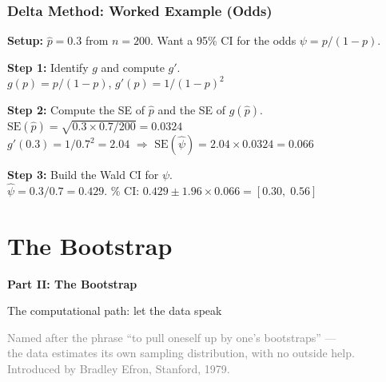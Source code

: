 \documentclass[aspectratio=169]{beamer}
\begin{document}
\begin{frame}
\frametitle{Delta Method: Worked Example (Odds)}

\small
\textbf{Setup:} $\hat{p} = 0.3$ from $n = 200$. Want a 95\% CI for the odds $\psi = p/(1-p)$.

\vspace{0.1cm}
\pause
\textbf{Step 1:} Identify $g$ and compute $g'$.\\[2pt]
$g(p) = p/(1-p)$, \quad $g'(p) = 1/(1-p)^2$

\pause
\vspace{0.1cm}
\textbf{Step 2:} Compute the SE of $\hat{p}$ and the SE of $g(\hat{p})$.\\[2pt]
$\text{SE}(\hat{p}) = \sqrt{0.3 \times 0.7 / 200} = 0.0324$\\[2pt]
$g'(0.3) = 1 / 0.7^2 = 2.04$ \qquad $\Rightarrow$ \qquad $\text{SE}(\hat\psi) = 2.04 \times 0.0324 = 0.066$

\pause
\vspace{0.1cm}
\textbf{Step 3:} Build the Wald CI for $\psi$.\\[2pt]
$\hat\psi = 0.3/0.7 = 0.429$. \% CI: $0.429 \pm 1.96 \times 0.066 = [0.30, \; 0.56]$

\vspace{0.15cm}
\begin{center}
\end{center}
\end{frame}

\section{The Bootstrap}

\begin{frame}
\begin{center}
  \vspace{1.5cm}
  {\Huge\bfseries\textcolor{popblue}{Part II: The Bootstrap}}

  \vspace{0.8cm}
  {\large The computational path: let the data speak}

  \vspace{0.5cm}
  {\small\textcolor{gray}{Named after the phrase ``to pull oneself up by one's bootstraps'' ---\\the data estimates its own sampling distribution, with no outside help.\\Introduced by Bradley Efron, Stanford, 1979.}}
\end{center}
\end{frame}
\end{document}
